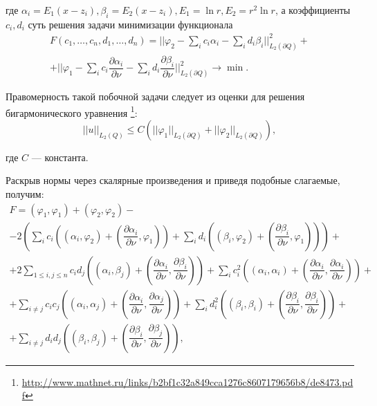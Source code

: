 \documentclass[a4paper]{article}
\begin{document}
где $\alpha_i=E_1(x-z_i), \beta_i = E_2(x-z_i), E_1=\ln r, E_2= r^2 \ln r$, а коэффициенты $c_i, d_i$ суть решения задачи минимизации функционала
\begin{multline*}
  F(c_1,\dots,c_n,d_1,\dots,d_n)= \biggl|\biggl|\varphi_2 -\sum_i c_i \alpha_i-\sum_i d_i \beta_i   \biggl|\biggl|_{L_2(\partial Q)}^2+\\
  +\biggl|\biggl|\varphi_1 -\sum_i c_i \dfrac{\partial \alpha_i}{\partial \nu} -\sum_i d_i \dfrac{\partial \beta_i }{\partial \nu}   \biggl|\biggl|_{L_2(\partial Q)}^2 \rightarrow \min .
\end{multline*}

Правомерность такой побочной задачи следует из оценки для решения бигармонического уравнения \footnote{\url{http://www.mathnet.ru/links/b2bf1c32a849cca1276c8607179656b8/de8473.pdf}}:
\begin{equation*}
  ||u||_{L_2(Q)} \leq C \left(||\varphi_1||_{L_2(\partial Q)}+ ||\varphi_2||_{L_2(\partial Q)} \right),
\end{equation*}

где $C$ --- константа.

Раскрыв нормы через скалярные произведения и приведя подобные слагаемые, получим:
\begin{multline}
  F=(\varphi_1,\varphi_1)+(\varphi_2,\varphi_2) - \\
  -2 \left(\sum_i c_i \left((\alpha_i,\varphi_2)+\left(\dfrac{\partial \alpha_i}{\partial \nu},\varphi_1\right)  \right)+\sum_i d_i \left((\beta_i,\varphi_2)+\left(\dfrac{\partial \beta_i}{\partial \nu},\varphi_1\right)  \right) \right)+\\
  +2\sum_{1 \leq i,j \leq n} c_i d_j \left((\alpha_i,\beta_j)+\left(\dfrac{\partial \alpha_i}{\partial \nu},\dfrac{\partial \beta_i}{\partial \nu}\right)  \right)+
  \sum_i c_i^2 \left(  (\alpha_i,\alpha_i)+\left(\dfrac{\partial \alpha_i}{\partial \nu},\dfrac{\partial \alpha_i}{\partial \nu}\right)  \right)+\\
  +\sum_{i \ne j} c_i c_j \left(  (\alpha_i,\alpha_j)+\left(\dfrac{\partial \alpha_i}{\partial \nu},\dfrac{\partial \alpha_j}{\partial \nu}\right)\right)+
  \sum_i d_i^2 \left(  (\beta_i,\beta_i)+\left(\dfrac{\partial \beta_i}{\partial \nu},\dfrac{\partial \beta_i}{\partial \nu}\right)  \right)+\\
  +\sum_{i \ne j} d_i d_j \left(  (\beta_i,\beta_j)+\left(\dfrac{\partial \beta_i}{\partial \nu},\dfrac{\partial \beta_j}{\partial \nu}\right)\right),
  \label{func}
\end{multline}
\end{document}
